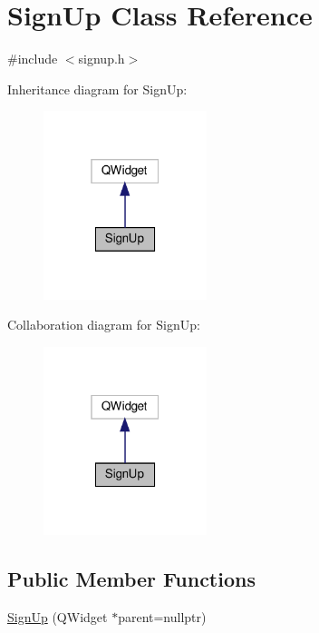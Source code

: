 \hypertarget{classSignUp}{}\section{Sign\+Up Class Reference}
\label{classSignUp}


{\ttfamily \#include $<$signup.\+h$>$}



Inheritance diagram for Sign\+Up\+:
\nopagebreak
\begin{figure}[H]
\begin{center}
\leavevmode
\includegraphics[width=135pt]{classSignUp__inherit__graph}
\end{center}
\end{figure}


Collaboration diagram for Sign\+Up\+:
\nopagebreak
\begin{figure}[H]
\begin{center}
\leavevmode
\includegraphics[width=135pt]{classSignUp__coll__graph}
\end{center}
\end{figure}
\subsection*{Public Member Functions}
\begin{DoxyCompactItemize}
\item 
\hyperlink{classSignUp_af6aa4663ced596037c4126462d2788cb}{Sign\+Up} (Q\+Widget $\ast$parent=nullptr)
\end{DoxyCompactItemize}
